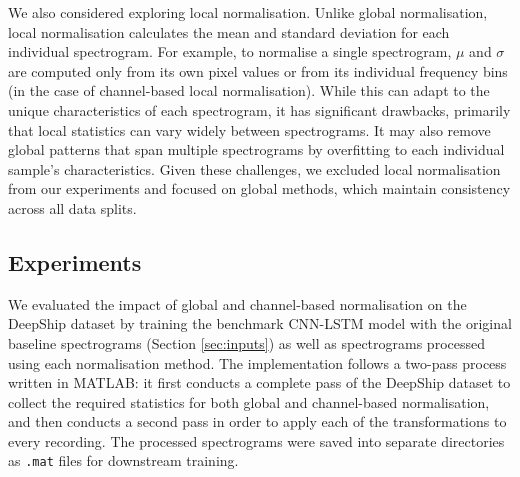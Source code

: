We also considered exploring local normalisation. Unlike global normalisation, local normalisation calculates the mean and standard deviation for each individual spectrogram. For example, to normalise a single spectrogram, $\mu$ and $\sigma$ are computed only from its own pixel values or from its individual frequency bins (in the case of channel-based local normalisation). While this can adapt to the unique characteristics of each spectrogram, it has significant drawbacks, primarily that local statistics can vary widely between spectrograms. It may also remove global patterns that span multiple spectrograms by overfitting to each individual sample's characteristics. Given these challenges, we excluded local normalisation from our experiments and focused on global methods, which maintain consistency across all data splits.

\subsection{Experiments}

We evaluated the impact of global and channel-based normalisation on the DeepShip dataset by training the benchmark CNN-LSTM model with the original baseline spectrograms (Section \ref{sec:inputs}) as well as spectrograms processed using each normalisation method. The implementation follows a two-pass process written in MATLAB: it first conducts a complete pass of the DeepShip dataset to collect the required statistics for both global and channel-based normalisation, and then conducts a second pass in order to apply each of the transformations to every recording. The processed spectrograms were saved into separate directories as \texttt{.mat} files for downstream training. 

